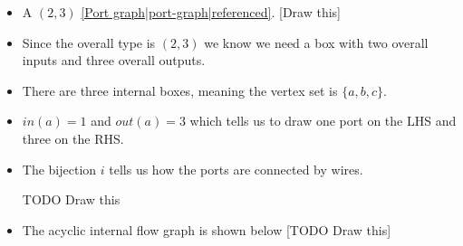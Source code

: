 
\begin{itemize}
    \item A $(2,3)$ \ref{Port graph|port-graph|referenced}. [Draw this]
    \item Since the overall type is $(2,3)$ we know we need a box with two overall inputs and three overall outputs.
    \item There are three internal boxes, meaning the vertex set is $\{a, b, c\}$.
    \item $in(a)=1$ and $out(a)=3$ which tells us to draw one port on the LHS and three on the RHS.
    \item The bijection $i$ tells us how the ports are connected by wires.
    \item [TODO Draw this]
    \item The acyclic internal flow graph is shown below [TODO Draw this]
  \end{itemize}
